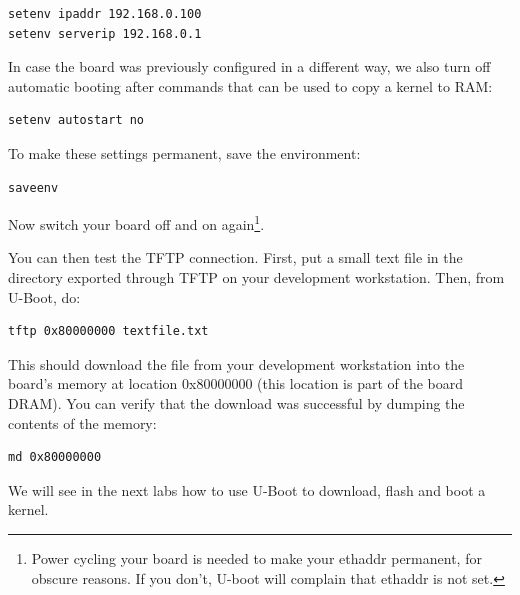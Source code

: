 \begin{verbatim}
setenv ipaddr 192.168.0.100
setenv serverip 192.168.0.1
\end{verbatim}

In case the board was previously configured in a different way, we
also turn off automatic booting after commands that can be used to
copy a kernel to RAM:

\begin{verbatim}
setenv autostart no
\end{verbatim}

To make these settings permanent, save the environment:

\begin{verbatim}
saveenv
\end{verbatim}

Now switch your board off and on again\footnote{Power cycling your
  board is needed to make your ethaddr permanent, for obscure
  reasons. If you don't, U-boot will complain that ethaddr is not
  set.}.

You can then test the TFTP connection. First, put a small text file in
the directory exported through TFTP on your development
workstation. Then, from U-Boot, do:

\begin{verbatim}
tftp 0x80000000 textfile.txt
\end{verbatim}

This should download the file  from your development
workstation into the board's memory at location 0x80000000 (this
location is part of the board DRAM). You can verify that the download
was successful by dumping the contents of the memory:

\begin{verbatim}
md 0x80000000
\end{verbatim}

We will see in the next labs how to use U-Boot to download, flash and
boot a kernel.
